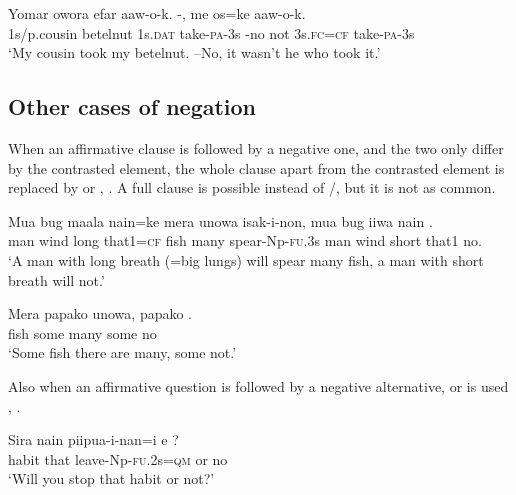 \ea%
\label{ex:6:x1116}
\gll Yomar  owora  efar  aaw-o-k. -,  me  os=ke  aaw-o-k.\\
1s/p.cousin  betelnut  1s.\textsc{dat}  take-\textsc{pa}-3s -no  not  3s.\textsc{fc}=\textsc{cf}  take-\textsc{pa}-3s\\
\glt `My cousin took my betelnut. --No, it wasn't he who took it.'
\z

\subsection{Other cases of negation} \label{sec:6.2.4}

When an affirmative clause is followed by a negative one, and the two only differ by the contrasted element, the whole clause apart from the contrasted element is replaced by  or  , . A full clause is possible instead of /, but it is not as common.

\ea%
\label{ex:6:x1119}
\gll Mua  bug  maala  nain=ke  mera  unowa  isak-i-non, mua  bug  iiwa  nain  .\\
man  wind  long  that1=\textsc{cf}  fish  many  spear-Np-\textsc{fu}.3s man  wind  short  that1  no.\\
\glt `A man with long breath (=big lungs) will spear many fish, a man with short breath will not.'
\z

\ea%
\label{ex:6:x1120}
\gll Mera  papako  unowa,  papako  . \\
fish  some  many  some  no\\
\glt `Some fish there are many, some not.'
\z

Also when an affirmative question is followed by a negative alternative,  or  is used , . 

\ea%
\label{ex:6:x1121}
\gll Sira  nain  piipua-i-nan=i  e  ? \\
habit  that  leave-Np-\textsc{fu}.2s=\textsc{qm}  or  no\\
\glt `Will you stop that habit or not?'
\z

